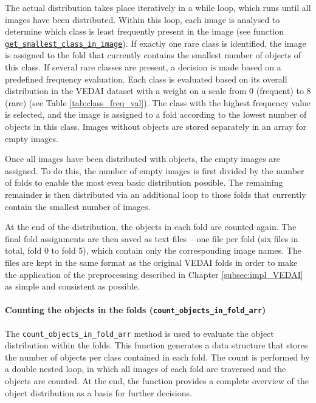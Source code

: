 The actual distribution takes place iteratively in a while loop, which runs until all images have been distributed. Within this loop, each image is analysed to determine which class is least frequently present in the image (see function \hyperlink{par:get_smallest_class_in_image}{\lstinline|get_smallest_class_in_image|}). If exactly one rare class is identified, the image is assigned to the fold that currently contains the smallest number of objects of this class. If several rare classes are present, a decision is made based on a predefined frequency evaluation. Each class is evaluated based on its overall distribution in the \acrshort{VEDAI} dataset with a weight on a scale from 0 (frequent) to 8 (rare) (see Table \ref{tab:class_freq_val}). The class with the highest frequency value is selected, and the image is assigned to a fold according to the lowest number of objects in this class. Images without objects are stored separately in an array for empty images.

Once all images have been distributed with objects, the empty images are assigned. To do this, the number of empty images is first divided by the number of folds to enable the most even basic distribution possible. The remaining remainder is then distributed via an additional loop to those folds that currently contain the smallest number of images.

At the end of the distribution, the objects in each fold are counted again. The final fold assignments are then saved as text files – one file per fold (six files in total, fold 0 to fold 5), which contain only the corresponding image names. The files are kept in the same format as the original \acrshort{VEDAI} folds in order to make the application of the preprocessing described in Chapter \ref{subsec:impl_VEDAI} as simple and consistent as possible.


\paragraph{Counting the objects in the folds (\lstinline|count_objects_in_fold_arr|)}
\hypertarget{par:count_objects_in_fold_arr}{}

The \lstinline|count_objects_in_fold_arr| method is used to evaluate the object distribution within the folds. This function generates a data structure that stores the number of objects per class contained in each fold. The count is performed by a double nested loop, in which all images of each fold are traversed and the objects are counted. At the end, the function provides a complete overview of the object distribution as a basis for further decisions.


